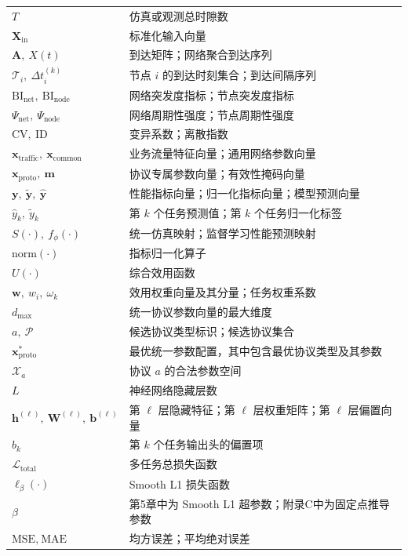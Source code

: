 \begin{longtable}{p{4.0cm}p{11.0cm}}
        $T$ &仿真或观测总时隙数\\
        $\mathbf{X}_{\mathrm{in}}$ &标准化输入向量\\
        $\mathbf{A},\ X(t)$ &到达矩阵；网络聚合到达序列\\
        $\mathcal{T}_i,\ \Delta t_i^{(k)}$ &节点 $i$ 的到达时刻集合；到达间隔序列\\
        $\mathrm{BI}_{\mathrm{net}},\ \mathrm{BI}_{\mathrm{node}}$ &网络突发度指标；节点突发度指标\\
        $\Psi_{\mathrm{net}},\ \Psi_{\mathrm{node}}$ &网络周期性强度；节点周期性强度\\
        $\mathrm{CV},\ \mathrm{ID}$ &变异系数；离散指数\\
        $\mathbf{x}_{\mathrm{traffic}},\ \mathbf{x}_{\mathrm{common}}$ &业务流量特征向量；通用网络参数向量\\
        $\mathbf{x}_{\mathrm{proto}},\ \mathbf{m}$ &协议专属参数向量；有效性掩码向量\\
        $\mathbf{y},\ \tilde{\mathbf{y}},\ \hat{\mathbf{y}}$ &性能指标向量；归一化指标向量；模型预测向量\\
        $\hat{y}_k,\ \tilde{y}_k$ &第 $k$ 个任务预测值；第 $k$ 个任务归一化标签\\
        $S(\cdot),\ f_{\phi}(\cdot)$ &统一仿真映射；监督学习性能预测映射\\
        $\mathrm{norm}(\cdot)$ &指标归一化算子\\
        $U(\cdot)$ &综合效用函数\\
        $\mathbf{w},\ w_i,\ \omega_k$ &效用权重向量及其分量；任务权重系数\\
        $d_{\max}$ &统一协议参数向量的最大维度\\
        $a,\ \mathcal{P}$ &候选协议类型标识；候选协议集合\\
        $\mathbf{x}_{\mathrm{proto}}^*$ &最优统一参数配置，其中包含最优协议类型及其参数\\
        $\mathcal{X}_a$ &协议 $a$ 的合法参数空间\\
        $L$ &神经网络隐藏层数\\
        $\mathbf{h}^{(\ell)},\ \mathbf{W}^{(\ell)},\ \mathbf{b}^{(\ell)}$ &第 $\ell$ 层隐藏特征；第 $\ell$ 层权重矩阵；第 $\ell$ 层偏置向量\\
        $b_k$ &第 $k$ 个任务输出头的偏置项\\
        $\mathcal{L}_{\text{total}}$ &多任务总损失函数\\
        $\ell_{\beta}(\cdot)$ &Smooth L1 损失函数\\
        $\beta$ &第5章中为 Smooth L1 超参数；附录C中为固定点推导参数\\
        $\text{MSE},\ \text{MAE}$ &均方误差；平均绝对误差\\


\end{longtable}
